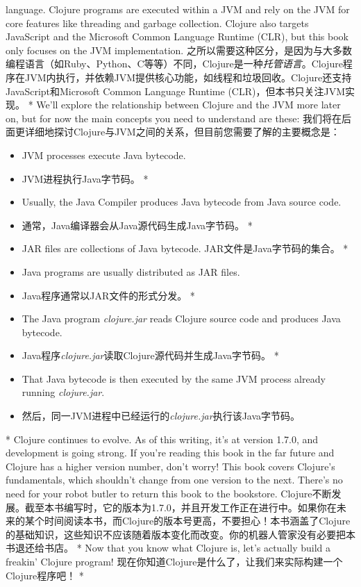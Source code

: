 \begin{paracol}{2}
{language}. Clojure programs are executed within a JVM and rely on the
JVM for core features like threading and garbage collection. Clojure
also targets JavaScript and the Microsoft Common Language Runtime (CLR),
but this book only focuses on the JVM implementation.
\switchcolumn
之所以需要这种区分，是因为与大多数编程语言（如Ruby、Python、C等等）不同，Clojure是一种\emph{托管语言}。Clojure程序在JVM内执行，并依赖JVM提供核心功能，如线程和垃圾回收。Clojure还支持JavaScript和Microsoft Common Language Runtime (CLR)，但本书只关注JVM实现。
\switchcolumn[0]*
We'll explore the relationship between Clojure and the JVM more later
on, but for now the main concepts you need to understand are these:
\switchcolumn
我们将在后面更详细地探讨Clojure与JVM之间的关系，但目前您需要了解的主要概念是：
\begin{itemize}
\switchcolumn[0]*
\item JVM processes execute Java bytecode.
\switchcolumn
\item JVM进程执行Java字节码。
\switchcolumn[0]*
\item Usually, the Java Compiler produces Java bytecode from Java source
code.
\switchcolumn
\item 通常，Java编译器会从Java源代码生成Java字节码。
\switchcolumn[0]*
\item JAR files are collections of Java bytecode.
\switchcolumn
JAR文件是Java字节码的集合。
\switchcolumn[0]*
\item Java programs are usually distributed as JAR files.
\switchcolumn
\item Java程序通常以JAR文件的形式分发。
\switchcolumn[0]*
\item The Java program \emph{clojure.jar} reads Clojure source code and
produces Java bytecode.
\switchcolumn
\item Java程序\emph{clojure.jar}读取Clojure源代码并生成Java字节码。
\switchcolumn[0]*
\item That Java bytecode is then executed by the same JVM process already
running \emph{clojure.jar}.
\switchcolumn
\item 然后，同一JVM进程中已经运行的\emph{clojure.jar}执行该Java字节码。
\end{itemize}
\switchcolumn[0]*
Clojure continues to evolve. As of this writing, it's at version 1.7.0,
and development is going strong. If you're reading this book in the far
future and Clojure has a higher version number, don't worry! This book
covers Clojure's fundamentals, which shouldn't change from one version
to the next. There's no need for your robot butler to return this book
to the bookstore.
\switchcolumn
Clojure不断发展。截至本书编写时，它的版本为1.7.0，并且开发工作正在进行中。如果你在未来的某个时间阅读本书，而Clojure的版本号更高，不要担心！本书涵盖了Clojure的基础知识，这些知识不应该随着版本变化而改变。你的机器人管家没有必要把本书退还给书店。
\switchcolumn[0]*
Now that you know what Clojure is, let's actually build a freakin'
Clojure program!
\switchcolumn
现在你知道Clojure是什么了，让我们来实际构建一个Clojure程序吧！
\switchcolumn[0]*

\end{paracol}
